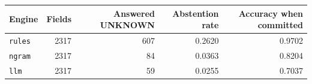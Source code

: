 \begingroup\small\setlength{\tabcolsep}{4pt}
\begin{tabular}{lrrrr}
\toprule
\textbf{Engine} & \textbf{Fields} & \textbf{Answered UNKNOWN} & \textbf{Abstention rate} & \textbf{Accuracy when committed} \\
\midrule
\texttt{rules} & 2317 & 607 & 0.2620 & 0.9702 \\  %
\texttt{ngram} & 2317 & 84 & 0.0363 & 0.8204 \\  %
\texttt{llm} & 2317 & 59 & 0.0255 & 0.7037 \\  %
\bottomrule
\end{tabular}
\endgroup
\par\smallskip{}
